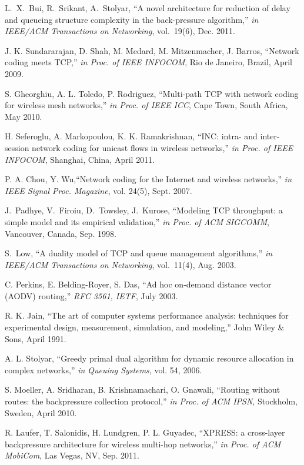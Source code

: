 \documentclass[conference]{IEEEtran}
\begin{document}
\begin{thebibliography}{}
 L.~X.~Bui, R.~Srikant, A.~Stolyar, ``A novel architecture for reduction of delay and queueing structure complexity in the back-pressure algorithm,'' {\em in IEEE/ACM Transactions on Networking}, vol.~19(6), Dec. 2011.

 J. K. Sundararajan, D. Shah, M. Medard, M. Mitzenmacher, J. Barros, ``Network coding meets TCP,'' {\em in Proc. of IEEE INFOCOM}, Rio de Janeiro, Brazil, April 2009.

 	S. Gheorghiu, A. L. Toledo, P. Rodriguez, ``Multi-path TCP with network coding for wireless mesh networks,'' {\em in Proc. of IEEE ICC}, Cape Town, South Africa, May 2010.

 H. Seferoglu, A. Markopoulou, K. K. Ramakrishnan, ``INC: intra- and inter-session network coding for unicast flows in wireless networks,'' {\em in Proc. of IEEE INFOCOM}, Shanghai, China, April 2011.

 P. A. Chou, Y. Wu,``Network coding for the Internet and wireless networks,'' {\em in IEEE Signal Proc. Magazine}, vol. 24(5), Sept. 2007.

 J.~Padhye, V.~Firoiu, D.~Towsley, J.~Kurose, ``Modeling TCP throughput: a simple model and its empirical validation,'' {\em in Proc. of ACM SIGCOMM}, Vancouver, Canada, Sep. 1998.

 S.~Low, ``A duality model of TCP and queue management algorithms,'' {\em in IEEE/ACM Transactions on Networking}, vol.~11(4), Aug. 2003.

 C. Perkins, E. Belding-Royer, S. Das, ``Ad hoc on-demand distance vector (AODV) routing,'' {\em RFC 3561, IETF}, July 2003.

 R. K. Jain, ``The art of computer systems performance analysis: techniques for experimental design, measurement, simulation, and modeling,'' John Wiley \& Sons, April 1991.

 A. L. Stolyar, ``Greedy primal dual algorithm for dynamic resource allocation in complex networks,'' {\em in Queuing Systems}, vol. 54, 2006.

 S. Moeller, A. Sridharan, B. Krishnamachari, O. Gnawali, ``Routing without routes: the backpressure collection protocol,'' {\em in Proc. of ACM IPSN}, Stockholm, Sweden, April 2010.

 R. Laufer, T. Salonidis, H. Lundgren, P. L. Guyadec, ``XPRESS: a cross-layer backpressure architecture for wireless multi-hop networks,'' {\em in Proc. of ACM MobiCom}, Las Vegas, NV, Sep. 2011.


\end{thebibliography}
\end{document}
